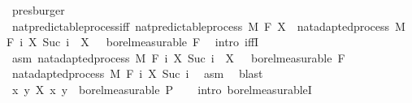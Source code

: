 \begin{isabellebody}
\ presburger\isanewline
{}\isamarkupfalse%
%
\endisatagproof
{\isafoldproof}%
%
\isadelimproof
\isanewline
%
\endisadelimproof
\isanewline
{}\isamarkupfalse%
\ nat{\isacharunderscore}{\kern0pt}predictable{\isacharunderscore}{\kern0pt}process{\isacharunderscore}{\kern0pt}iff{\isacharcolon}{\kern0pt}\ {\isachardoublequoteopen}nat{\isacharunderscore}{\kern0pt}predictable{\isacharunderscore}{\kern0pt}process\ M\ F\ X\ {\isasymlongleftrightarrow}\ nat{\isacharunderscore}{\kern0pt}adapted{\isacharunderscore}{\kern0pt}process\ M\ F\ {\isacharparenleft}{\kern0pt}{\isasymlambda}i{\isachardot}{\kern0pt}\ X\ {\isacharparenleft}{\kern0pt}Suc\ i{\isacharparenright}{\kern0pt}{\isacharparenright}{\kern0pt}\ {\isasymand}\ X\ {}\ {\isasymin}\ borel{\isacharunderscore}{\kern0pt}measurable\ {\isacharparenleft}{\kern0pt}F\ {}{\isacharparenright}{\kern0pt}{\isachardoublequoteclose}\isanewline
%
\isadelimproof
%
\endisadelimproof
%
\isatagproof
{}\isamarkupfalse%
\ {\isacharparenleft}{\kern0pt}intro\ iffI{\isacharparenright}{\kern0pt}\isanewline
\ \ \isamarkupfalse%
\ asm{\isacharcolon}{\kern0pt}\ {\isachardoublequoteopen}nat{\isacharunderscore}{\kern0pt}adapted{\isacharunderscore}{\kern0pt}process\ M\ F\ {\isacharparenleft}{\kern0pt}{\isasymlambda}i{\isachardot}{\kern0pt}\ X\ {\isacharparenleft}{\kern0pt}Suc\ i{\isacharparenright}{\kern0pt}{\isacharparenright}{\kern0pt}\ {\isasymand}\ X\ {}\ {\isasymin}\ borel{\isacharunderscore}{\kern0pt}measurable\ {\isacharparenleft}{\kern0pt}F\ {}{\isacharparenright}{\kern0pt}{\isachardoublequoteclose}\isanewline
\ \ \isamarkupfalse%
\ nat{\isacharunderscore}{\kern0pt}adapted{\isacharunderscore}{\kern0pt}process\ M\ F\ {\isachardoublequoteopen}{\isasymlambda}i{\isachardot}{\kern0pt}\ X\ {\isacharparenleft}{\kern0pt}Suc\ i{\isacharparenright}{\kern0pt}{\isachardoublequoteclose}\ \isamarkupfalse%
\ asm\ \isamarkupfalse%
\ blast\isanewline
\ \ \isamarkupfalse%
\ {\isachardoublequoteopen}{\isacharparenleft}{\kern0pt}{\isasymlambda}{\isacharparenleft}{\kern0pt}x{\isacharcomma}{\kern0pt}\ y{\isacharparenright}{\kern0pt}{\isachardot}{\kern0pt}\ X\ x\ y{\isacharparenright}{\kern0pt}\ {\isasymin}\ borel{\isacharunderscore}{\kern0pt}measurable\ {\isasymSigma}\isactrlsub P{\isachardoublequoteclose}\isanewline
\ \ \isamarkupfalse%
\ {\isacharparenleft}{\kern0pt}intro\ borel{\isacharunderscore}{\kern0pt}measurableI{\isacharparenright}{\kern0pt}\isanewline

\end{isabellebody}
